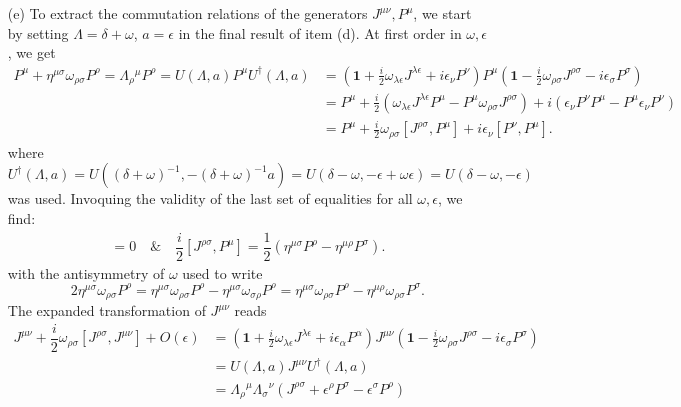 \documentclass[10pt, a4paper]{article}
\begin{document}
\begin{enumerate}
  \item[(e)] To extract the commutation relations of the generators $J^{\mu \nu}, P^{\mu}$, we start by setting $\Lambda = \delta + \omega$, $a = \epsilon$ in the final result of item (d). At first order in $\omega, \epsilon$, we get
  \begin{align*}
    P^\mu + \eta^{\mu \sigma}\omega_{\rho \sigma} P^\rho = \Lambda_\rho{ }^\mu P^\rho = U(\Lambda, a) P^\mu U^{\dagger}(\Lambda, a) &= \left(\mathbf{1}+\frac{i}{2} \omega_{\lambda \epsilon} J^{\lambda \epsilon}+i \epsilon_\nu P^\nu\right) P^\mu \left(\mathbf{1}-\frac{i}{2} \omega_{\rho \sigma} J^{\rho \sigma}-i \epsilon_\sigma P^\sigma\right)\\
    &= P^\mu + \frac{i}{2} \left(\omega_{\lambda \epsilon} J^{\lambda \epsilon}P^{\mu} - P^{\mu} \omega_{\rho \sigma}  J^{\rho \sigma}\right)+i (\epsilon_\nu P^\nu P^\mu - P^\mu \epsilon_\nu P^\nu)\\
    &= P^\mu + \frac{i}{2} \omega_{\rho \sigma} [J^{\rho \sigma}, P^{\mu}]  +i \epsilon_\nu [P^{\nu}, P^{\mu}].
   \end{align*}
   where $U^{\dagger}(\Lambda, a) = U((\delta + \omega)^{-1}, -(\delta + \omega)^{-1} a) = U(\delta - \omega, -\epsilon + \omega \epsilon) = U(\delta - \omega, -\epsilon)$ was used. Invoquing the validity of the last set of equalities for all $\omega, \epsilon$, we find: 
    \begin{align*}
      [P^{\nu}, P^{\mu}] = 0 \quad \& \quad \dfrac{i}{2}[J^{\rho \sigma}, P^{\mu}] =  \dfrac{1}{2}\left(\eta^{\mu \sigma}P^\rho- \eta^{\mu \rho} P^\sigma\right).
    \end{align*}
    with the antisymmetry of $\omega$ used to write $$2\eta^{\mu \sigma}\omega_{\rho \sigma} P^\rho = \eta^{\mu \sigma}\omega_{\rho \sigma} P^\rho - \eta^{\mu \sigma}\omega_{\sigma \rho} P^\rho = \eta^{\mu \sigma}\omega_{\rho \sigma} P^\rho - \eta^{\mu \rho}\omega_{\rho \sigma} P^\sigma. $$
    The expanded transformation of $J^{\mu\nu}$ reads 
    \begin{align*}
      J^{\mu \nu} + \dfrac{i}{2} \omega_{\rho\sigma} [J^{\rho \sigma}, J^{\mu \nu}] + O(\epsilon) &= \left(\mathbf{1}+\frac{i}{2} \omega_{\lambda \epsilon} J^{\lambda \epsilon}+i \epsilon_\alpha P^\alpha\right) J^{\mu \nu} \left(\mathbf{1}-\frac{i}{2} \omega_{\rho \sigma} J^{\rho \sigma}-i \epsilon_\sigma P^\sigma\right)\\
      &= U(\Lambda, a) J^{\mu\nu} U^{\dagger}(\Lambda, a)\\
      &= \Lambda_\rho{ }^\mu \Lambda_\sigma{ }^\nu\left(J^{\rho \sigma}+\epsilon^\rho P^\sigma-\epsilon^\sigma P^\rho\right) \\

\end{align*}
\end{enumerate}
\end{document}
